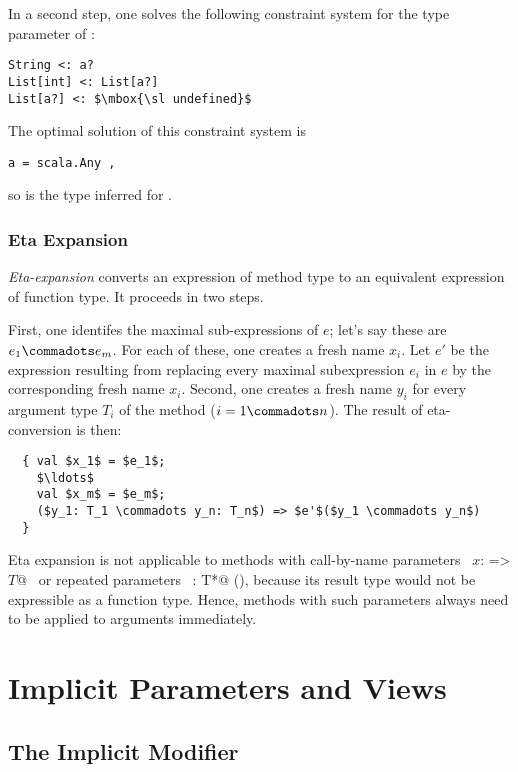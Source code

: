 In a second step, one solves the following constraint system for
the type parameter  of :
\begin{lstlisting}
String <: a?
List[int] <: List[a?]
List[a?] <: $\mbox{\sl undefined}$
\end{lstlisting}
The optimal solution of this constraint system is
\begin{lstlisting}
a = scala.Any ,
\end{lstlisting}
so  is the type inferred for .

\subsection{Eta Expansion}\label{sec:eta-expand}

  {\em Eta-expansion} converts an expression of method type to an
  equivalent expression of function type. It proceeds in two steps.

  First, one identifes the maximal sub-expressions of $e$; let's
  say these are $e_1 \commadots e_m$. For each of these, one creates a
  fresh name $x_i$. Let $e'$ be the expression resulting from
  replacing every maximal subexpression $e_i$ in $e$ by the
  corresponding fresh name $x_i$. Second, one creates a fresh name $y_i$
  for every argument type $T_i$ of the method ($i = 1 \commadots
  n$). The result of eta-conversion is then:
\begin{lstlisting}
  { val $x_1$ = $e_1$; 
    $\ldots$ 
    val $x_m$ = $e_m$; 
    ($y_1: T_1 \commadots y_n: T_n$) => $e'$($y_1 \commadots y_n$) 
  }
\end{lstlisting}

Eta expansion is not applicable to methods with call-by-name
parameters ~\lstinline@$x$: => $T$@~ or repeated parameters
~\lstinline@x: T*@ (), because its result type
would not be expressible as a function type. Hence, methods with such
parameters always need to be applied to arguments immediately.


\chapter{Implicit Parameters and Views}\label{sec:implicits}

\section{The Implicit Modifier}\label{sec:impl-defs}

